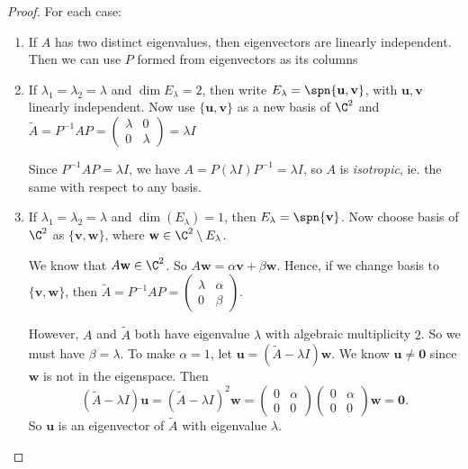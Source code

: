 \documentclass[a4paper]{article}
\begin{document}
  \begin{proof}
    For each case:
    \begin{enumerate}
      \item If $A$ has two distinct eigenvalues, then eigenvectors are linearly independent. Then we can use $P$ formed from eigenvectors as its columns
      \item If $\lambda_1=\lambda_2 = \lambda$ and $\dim E_\lambda = 2$, then write $E_\lambda = \spn\{\mathbf{u}, \mathbf{v}\}$, with $\mathbf{u}, \mathbf{v}$ linearly independent. Now use $\{\mathbf{u}, \mathbf{v}\}$  as a new basis of $\C^2$ and $\tilde{A} = P^{-1}AP = 
        \begin{pmatrix}
          \lambda & 0\\
          0 & \lambda
        \end{pmatrix} = \lambda I$

        \note Since $P^{-1}AP = \lambda I$, we have $A = P(\lambda I)P^{-1} = \lambda I$, so $A$ is \emph{isotropic}, ie. the same with respect to any basis.
      \item If $\lambda_1 = \lambda_2 = \lambda$ and $\dim (E_\lambda) = 1$, then $E_\lambda = \spn\{\mathbf{v}\}$. Now choose basis of $\C^2$ as $\{\mathbf{v}, \mathbf{w}\}$, where $\mathbf{w}\in \C^2\setminus E_\lambda$.

        We know that $A\mathbf{w}\in \C^2$. So $A\mathbf{w} = \alpha \mathbf{v} + \beta \mathbf{w}$. Hence, if we change basis to $\{\mathbf{v}, \mathbf{w}\}$, then $\tilde{A} = P^{-1}AP = 
        \begin{pmatrix}
          \lambda & \alpha\\
          0 & \beta
        \end{pmatrix}$.

        However, $A$ and $\tilde{A}$ both have eigenvalue $\lambda$ with algebraic multiplicity $2$. So we must have $\beta = \lambda$. To make $\alpha = 1$, let $\mathbf{u} = (\tilde{A} - \lambda I)\mathbf{w}$. We know $\mathbf{u}\not= \mathbf{0}$ since $\mathbf{w}$ is not in the eigenspace. Then 
        \[
          (\tilde{A} - \lambda I)\mathbf{u} = (\tilde{A} - \lambda I)^2 \mathbf{w} = 
          \begin{pmatrix}
            0 & \alpha\\
            0 & 0
          \end{pmatrix}
          \begin{pmatrix}
            0 & \alpha\\
            0 & 0
          \end{pmatrix}\mathbf{w} = \mathbf{0}.
        \]
        So $\mathbf{u}$ is an eigenvector of $\tilde{A}$ with eigenvalue $\lambda$.


\end{enumerate}
\end{proof}
\end{document}
